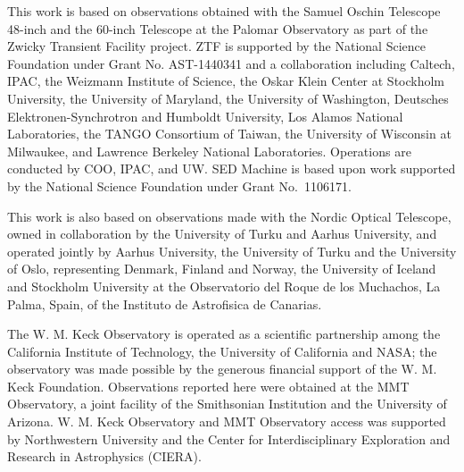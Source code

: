 \documentclass[twocolumn]{aastex631}
\begin{document}
\begin{CJK*}{UTF8}{gbsn}

This work is based on observations obtained with the Samuel Oschin Telescope 48-inch and the 60-inch Telescope at the Palomar Observatory as part of the Zwicky Transient Facility project. ZTF is supported by the National Science Foundation under Grant No. AST-1440341 and a collaboration including Caltech, IPAC, the Weizmann Institute of Science, the Oskar Klein Center at Stockholm University, the University of Maryland, the University of Washington, Deutsches Elektronen-Synchrotron and Humboldt University, Los Alamos National Laboratories, the TANGO Consortium of Taiwan, the University of Wisconsin at Milwaukee, and Lawrence Berkeley National Laboratories. Operations are conducted by COO, IPAC, and UW. 
SED Machine is based upon work supported by the National Science Foundation under Grant No.\ 1106171.

This work is also based on observations made with the Nordic Optical Telescope, owned in collaboration by the University of Turku and Aarhus University, and operated jointly by Aarhus University, the University of Turku and the University of Oslo, representing Denmark, Finland and Norway, the University of Iceland and Stockholm University at the Observatorio del Roque de los Muchachos, La Palma, Spain, of the Instituto de Astrofisica de Canarias.

The W. M. Keck Observatory is operated as a scientific partnership among the California Institute of Technology, the University of California and NASA; the observatory was made possible by the generous financial support of the W. M. Keck Foundation. Observations reported here were obtained at the MMT Observatory, a joint facility of the Smithsonian Institution and the University of Arizona. W. M. Keck Observatory and MMT Observatory access was supported by Northwestern University and the Center for Interdisciplinary Exploration and Research in Astrophysics (CIERA).


\end{CJK*}
\end{document}

